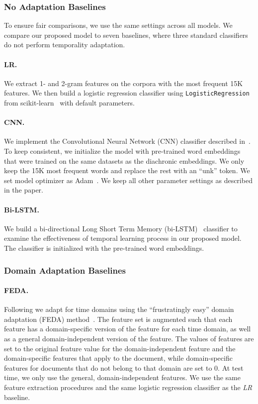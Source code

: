 \subsubsection{No Adaptation Baselines}
To ensure fair comparisons, we use the same settings across all models. We compare our proposed model to seven baselines, where three standard classifiers do not perform temporality adaptation.

\paragraph{LR.} We extract 1- and 2-gram features on the corpora with the most frequent 15K features. We then build a logistic regression classifier using \texttt{LogisticRegression} from scikit-learn~\cite{pedregosa2011scikit} with default parameters.

\paragraph{CNN.} We implement the Convolutional Neural Network (CNN) classifier described in~\cite{kim2014convolutional}. To keep consistent, we initialize the model with pre-trained word embeddings~\cite{bojanowski2017enriching} that were trained on the same datasets as the diachronic embeddings. We only keep the 15K most frequent words and replace the rest with an ``unk'' token. We set model optimizer as Adam~\cite{kingma2014adam}. We keep all other parameter settings as described in the paper.

\paragraph{Bi-LSTM.} We build a bi-directional Long Short Term Memory (bi-LSTM)~\cite{hochreiter1997long} classifier to examine the effectiveness of temporal learning process in our proposed model. The classifier is initialized with the pre-trained word embeddings.

\subsubsection{Domain Adaptation Baselines}
\paragraph{FEDA.} Following \cite{huang2018examining} we adapt for time domains using the ``frustratingly easy'' domain adaptation (FEDA) method~\cite{daume2007frustratingly}. 
The feature set is augmented such that each feature has a domain-specific version of the feature for each time domain, as well as a general domain-independent version of the feature.
The values of features are set to the original feature value for the domain-independent feature and the domain-specific features that apply to the document, while domain-specific features for documents that do not belong to that domain are set to $0$.
At test time, we only use the general, domain-independent features. 
We use the same feature extraction procedures and the same logistic regression classifier as the \textit{LR} baseline.

